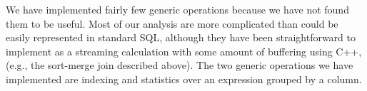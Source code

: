 We have implemented fairly few generic operations because we have not
found them to be useful.  Most of our analysis are more complicated
than could be easily represented in standard SQL, although they have
been straightforward to implement as a streaming calculation with some
amount of buffering using C++, (e.g.,
 the sort-merge join described above).  The two generic operations we have
implemented are indexing and statistics over an expression grouped by
a column.  
%

